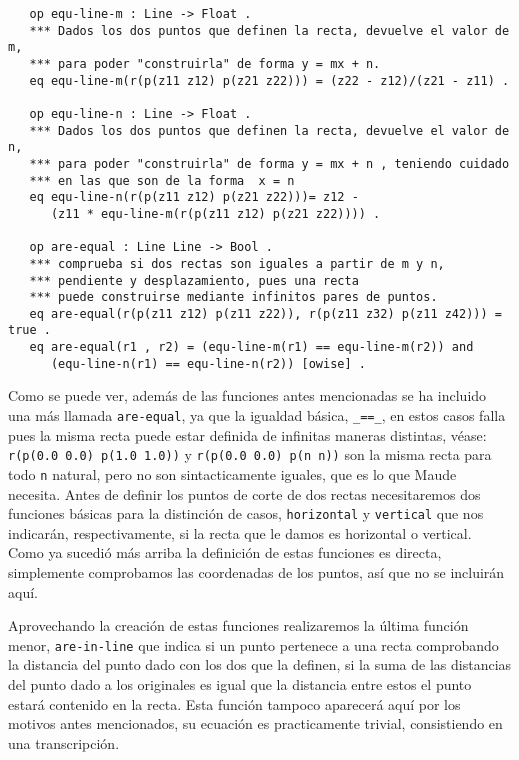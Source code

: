 {\codesize
\begin{verbatim}
   op equ-line-m : Line -> Float .
   *** Dados los dos puntos que definen la recta, devuelve el valor de m, 
   *** para poder "construirla" de forma y = mx + n.
   eq equ-line-m(r(p(z11 z12) p(z21 z22))) = (z22 - z12)/(z21 - z11) .

   op equ-line-n : Line -> Float .
   *** Dados los dos puntos que definen la recta, devuelve el valor de n, 
   *** para poder "construirla" de forma y = mx + n , teniendo cuidado 
   *** en las que son de la forma  x = n
   eq equ-line-n(r(p(z11 z12) p(z21 z22)))= z12 - 
      (z11 * equ-line-m(r(p(z11 z12) p(z21 z22)))) .

   op are-equal : Line Line -> Bool .
   *** comprueba si dos rectas son iguales a partir de m y n, 
   *** pendiente y desplazamiento, pues una recta
   *** puede construirse mediante infinitos pares de puntos.
   eq are-equal(r(p(z11 z12) p(z11 z22)), r(p(z11 z32) p(z11 z42))) = true . 
   eq are-equal(r1 , r2) = (equ-line-m(r1) == equ-line-m(r2)) and 
      (equ-line-n(r1) == equ-line-n(r2)) [owise] .
\end{verbatim}
}

Como se puede ver, además de las funciones antes mencionadas se ha incluido una más llamada \texttt{are-equal}, ya que la igualdad básica, \verb"_==_", en estos casos falla pues la misma recta puede estar definida de infinitas maneras distintas, véase: \texttt{r(p(0.0 0.0) p(1.0 1.0))} y \texttt{r(p(0.0 0.0) p(n n))} son la misma recta para todo \texttt{n} natural, pero no son sintacticamente iguales, que es lo que Maude necesita. Antes de definir los puntos de corte de dos rectas necesitaremos dos funciones básicas para la distinción de casos, \texttt{horizontal} y \texttt{vertical} que nos indicarán, respectivamente, si la recta que le damos es horizontal o vertical. Como ya sucedió más arriba la definición de estas funciones es directa, simplemente comprobamos las coordenadas de los puntos, así que no se incluirán aquí.\par
Aprovechando la creación de estas funciones realizaremos la última función menor, \texttt{are-in-line} que indica si un punto pertenece a una recta comprobando la distancia del punto dado con los dos que la definen, si la suma de las distancias del punto dado a los originales es igual que la distancia entre estos el punto estará contenido en la recta. Esta función tampoco aparecerá aquí por los motivos antes mencionados, su ecuación es practicamente trivial, consistiendo en una transcripción.\par

